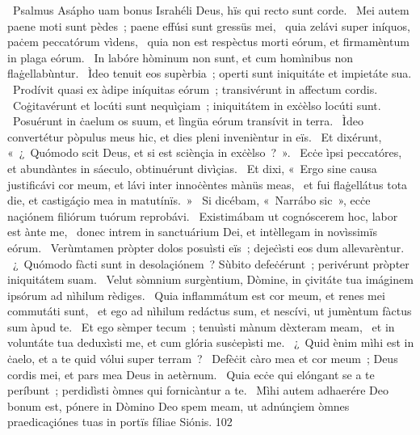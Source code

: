 {~Psalmus Asápho}
{%
uam bonus Israhéli Deus, hïs qui recto sunt corde.
~Mei autem paene moti sunt pèdes~; paene effúsi sunt gressüs mei,
~quia zelávi super iníquos, paċem peccatórum vìdens,
~quia non est respèctus morti eórum, et firmamèntum in plaga eórum.
~In labóre hòminum non sunt, et cum homìnibus non flaġellabùntur.
~Ìdeo tenuit eos supèrbia~; operti sunt iniquitáte et impietáte sua.
~Prodívit quasi ex àdipe iníquitas eórum~; transivérunt in affectum cordis.
~Coġitavérunt et locúti sunt nequìçiam~; iniquitátem in exċèlso locúti sunt.
~Posuérunt in ċaelum os suum, et lìngüa eórum transívit in terra.
~Ìdeo convertétur pòpulus meus hic, et dies pleni invenièntur in eïs.
~Et dixérunt, «~¿~Quómodo scit Deus, et si est sciènçia in exċèlso~?~».
~Ecċe ìpsi peccatóres, et abundàntes in sáeculo, obtinuérunt divìçias.
~Et dixi, «~Ergo sine causa justificávi cor meum, et lávi inter innoċèntes mànüs meas,
~et fui flaġellátus tota die, et castigáçio mea in matutínïs.~»
~Si dicébam, «~Narrábo sic~», ecċe naçiónem filiórum tuórum reprobávi.
~Existimábam ut cognóscerem hoc, labor est ànte me,
~donec intrem in sanctuárium Dei, et intèllegam in novìssimïs eórum.
~Verùmtamen pròpter dolos posuìsti eïs~; dejeċìsti eos dum allevarèntur.
~¿~Quómodo fàcti sunt in desolaçiónem~? Sùbito defeċérunt~; perivérunt pròpter iniquitátem suam.
~Velut sòmnium surgèntium, Dòmine, in çivitáte tua imáginem ipsórum ad nìhilum rèdiges.
~Quia inflammátum est cor meum, et renes mei commutáti sunt,
~et ego ad nìhilum redáctus sum, et nescívi, ut jumèntum fàctus sum àpud te.
~Et ego sèmper tecum~; tenuìsti mànum dèxteram meam,
~et in voluntáte tua deduxìsti me, et cum glória susċepìsti me.
~¿~Quid ènim mìhi est in ċaelo, et a te quid vólui super terram~?
~Defèċit càro mea et cor meum~; Deus cordis mei, et pars mea Deus in aetèrnum.
~Quia ecċe qui elóngant se a te períbunt~; perdidìsti òmnes qui fornicàntur a te.
~Mìhi autem adhaerére Deo bonum est, pónere in Dòmino Deo spem meam, ut adnúnçiem òmnes praedicaçiónes tuas in portïs fíliae Siónis.
}
{10}{2}

